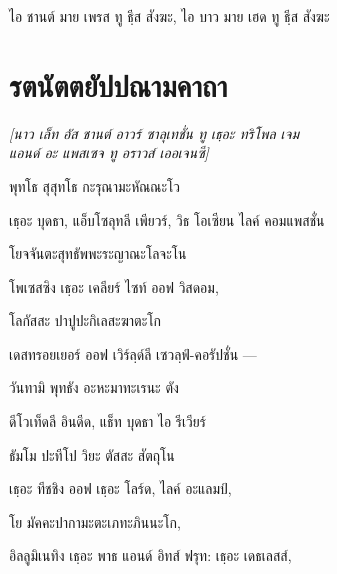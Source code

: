 \begin{english}
ไอ ชานต์ มาย เพรส ทู ธฺีส สังฆะ, ไอ บาว มาย เฮด ทู ธฺีส สังฆะ 
\end{english}

\chapter{รตนัตตยัปปณามคาถา}

\begin{leader}
\end{leader}

\begin{leader}
\textit{[นาว เล็ท อัส ชานต์ อาวร์ ซาลุเทชั่น ทู เธฺอะ ทริโพล เจม\\
แอนด์ อะ แพสเซจ ทู อราวส์ เออเจนซี]}
\end{leader}


พุทโธ สุสุทโธ กะรุณามะหัณณะโว

\begin{english}
เธฺอะ บุดธา, แอ็บโซลุทลี เพียวร์, วิธ โอเซียน ไลค์ คอมแพสชั่น
\end{english}

โยจจันตะสุทธัพพะระญาณะโลจะโน

\begin{english}
โพเซสซิง เธฺอะ เคลียร์ ไซท์ ออฟ วิสดอม,
\end{english}

โลกัสสะ ปาปูปะกิเลสะฆาตะโก

\begin{english}
เดสทรอยเยอร์ ออฟ เวิร์ลฺด์ลี เซวลฺฟ์-คอรัปชั่น —
\end{english}

วันทามิ พุทธัง อะหะมาทะเรนะ ตัง

\begin{english}
ดีโวเท็ดลี อินดีด, แธ็ท บุดธา ไอ รีเวียร์
\end{english}

ธัมโม ปะทีโป วิยะ ตัสสะ สัตถุโน

\begin{english}
เธฺอะ ทีชชิง ออฟ เธฺอะ โลร์ด, ไลค์ อะแลมป์,
\end{english}

โย มัคคะปากามะตะเภทะภินนะโก,

\begin{english}
อิลลูมิเนทิง เธฺอะ พาธ แอนด์ อิทส์ ฟรุท: เธฺอะ เดธเลสส์,
\end{english}

